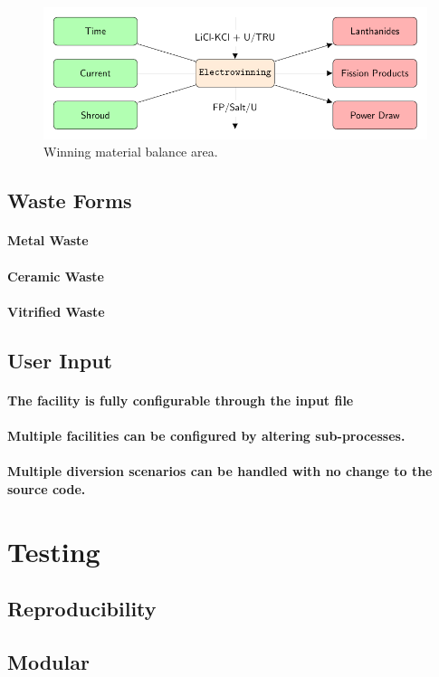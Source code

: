 \begin{figure} 
	\centering
	\includegraphics[width=0.8\linewidth]{images/winning}
	\caption{Winning material balance area.}
	\label{fig:winning}
\end{figure}

\subsection{Waste Forms}
\paragraph{Metal Waste}

\paragraph{Ceramic Waste}

\paragraph{Vitrified Waste}


\subsection{User Input}
\paragraph{The facility is fully configurable through the input file}

\paragraph{Multiple facilities can be configured by altering sub-processes.}

\paragraph{Multiple diversion scenarios can be handled with no change to the source code.}


\section{Testing}

\subsection{Reproducibility}

\subsection{Modular}